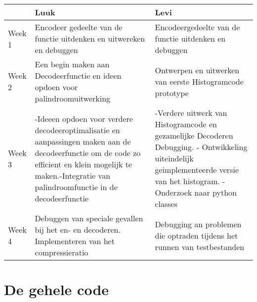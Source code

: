 \documentclass{article}
\begin{document}
\begin{tabular}{ l | p{6cm} p{6cm} }
   & Luuk & Levi \\
  \hline
  Week 1 & Encodeer gedeelte van de functie uitdenken en uitwereken en debuggen & Encodeergedeelte van de functie uitdenken en debuggen \\
  Week 2 & Een begin maken aan Decodeerfunctie en ideen opdoen voor palindroomuitwerking & Ontwerpen en uitwerken van eerste Histogramcode prototype \\
  Week 3 & -Ideeen opdoen voor verdere decodeeroptimalisatie en aanpassingen maken aan de decodeerfunctie om de code zo efficient en klein mogelijk te maken.\linebreak -Integratie van palindroomfunctie in de decodeerfunctie & -Verdere uitwerk van Histogramcode en gezamelijke Decoderen Debugging. \linebreak - Ontwikkeling uiteindelijk geimplementeerde versie van het histogram.  \linebreak  - Onderzoek naar python classes \\
  Week 4  & Debuggen van speciale gevallen bij het en- en decoderen. Implementeren van het compressieratio & Debugging an problemen die optraden tijdens het runnen van testbestanden \\
 
 
 
  
\end{tabular}

\section{De gehele code}
 
\end{document}
